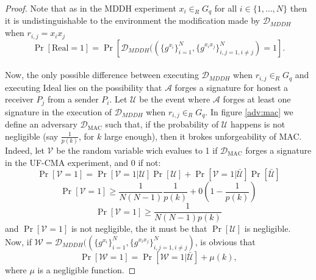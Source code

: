\documentclass{acm_proc_article-sp}
\begin{document}
\begin{proof}
Note that as in the MDDH experiment $x_i \in_{R} G_q$ for all $i \in \{1, \ldots, N\}$ then it is undistinguishable
to the environment the modification made by $\mathcal{D}_{MDDH}$ when $r_{i,j} = x_ix_j$
\begin{equation}
\Pr[\mathrm{Real} = 1] = \Pr[\mathcal{D}_{MDDH}((\{g^{x_i}\}_{i=1}^N, \{g^{x_ix_j}\}_{i,j=1,i\neq j}^N) = 1].
\label{eq:ddh_1}
\end{equation}\\
Now, the only possible difference between executing $\mathcal{D}_{MDDH}$ when $r_{i,j} \in_R G_q$ and executing
Ideal lies on the possibility that $\mathcal{A}$ forges a signature for honest a receiver $P_j$ from a sender
$P_i$. Let $\mathcal{U}$ be the event where $\mathcal{A}$ forges at least one signature in the execution of
$\mathcal{D}_{MDDH}$ when $r_{i,j} \in_R G_q$. In figure \ref{adv:mac} we define
an adversary $\mathcal{D}_\mathrm{MAC}$ such that, if the probability of $\mathcal{U}$ happens is not
negligible (say $\frac{1}{p(k)}$, for $k$ large enough), then it brokes unforgeability of MAC. Indeed,
let $\mathcal{V}$ be the random variable wich
evalues to 1 if $\mathcal{D}_\mathrm{MAC}$ forges a signature in the UF-CMA experiment, and 0 if not:
$$
\Pr[\mathcal{V}=1] = \Pr[\mathcal{V}=1|\mathcal{U}]\Pr[\mathcal{U}] +
                     \Pr[\mathcal{V}=1|\bar{\mathcal{U}}]\Pr[\bar{\mathcal{U}}]
$$
$$
\Pr[\mathcal{V}=1] \geq \frac{1}{N(N-1)}\frac{1}{p(k)} +
                        0\left(1-\frac{1}{p(k)}\right)
$$
$$
\Pr[\mathcal{V}=1] \geq \frac{1}{N(N-1)p(k)}
$$
and $\Pr[\mathcal{V}=1]$ is not negligible, the it must be that $\Pr[\mathcal{U}]$ is
negligible.\\
Now, if $\mathcal{W} = \mathcal{D}_{MDDH}((\{g^{x_i}\}_{i=1}^N, \{g^{x_ix_j}\}_{i,j=1,i\neq j}^N)$, is
obvious that
$$
\Pr[\mathcal{W} = 1] = \Pr[\mathcal{W}=1|\bar{\mathcal{U}}] + \mu(k),
$$
where $\mu$ is a negligible function. 


\end{proof}
\end{document}
